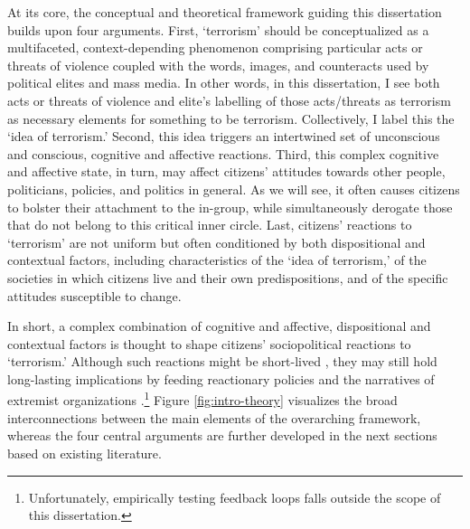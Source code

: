 At its core, the conceptual and theoretical framework guiding this dissertation builds upon four arguments. First, `terrorism' should be conceptualized as a multifaceted, context-depending phenomenon comprising particular acts or threats of violence coupled with the words, images, and counteracts used by political elites and mass media. In other words, in this dissertation, I see both acts or threats of violence and elite's labelling of those acts/threats as terrorism as necessary elements for something to be terrorism. Collectively, I label this the `idea of terrorism.' Second, this idea triggers an intertwined set of unconscious and conscious, cognitive and affective reactions. Third, this complex cognitive and affective state, in turn, may affect citizens' attitudes towards other people, politicians, policies, and politics in general. As we will see, it often causes citizens to bolster their attachment to the in-group, while simultaneously derogate those that do not belong to this critical inner circle. Last, citizens' reactions to `terrorism' are not uniform but often conditioned by both dispositional and contextual factors, including characteristics of the `idea of terrorism,' of the societies in which citizens live and their own predispositions, and of the specific attitudes susceptible to change. 


In short, a complex combination of cognitive and affective, dispositional and contextual factors is thought to shape citizens' sociopolitical reactions to `terrorism.' Although such reactions might be short-lived \citep{Sniderman2019a}, they may still hold long-lasting implications by feeding reactionary policies \citep{Tomz2019} and the narratives of extremist organizations \citep{Bail2018}.\footnote{Unfortunately, empirically testing feedback loops falls outside the scope of this dissertation.} Figure \ref{fig:intro-theory} visualizes the broad interconnections between the main elements of the overarching framework, whereas the four central arguments are further developed in the next sections based on existing literature. 



